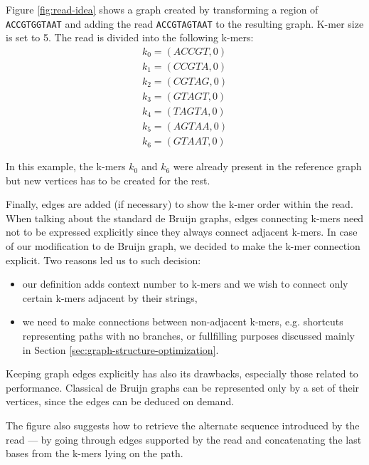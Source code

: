 Figure \ref{fig:read-idea} shows a graph created by transforming a region of \texttt{ACCGTGGTAAT} and adding the read \texttt{ACCGTAGTAAT} to the resulting graph. K-mer size is set to 5. The read is divided into the following k-mers:
\begin{align}
k_0 = (ACCGT, 0) \\
k_1 = (CCGTA, 0) \\
k_2 = (CGTAG, 0) \\
k_3 = (GTAGT, 0) \\
k_4 = (TAGTA, 0) \\
k_5 = (AGTAA, 0) \\
k_6 = (GTAAT, 0)
\end{align}

In this example, the k-mers $k_0$ and $k_6$ were already present in the reference graph but new vertices has to be created for the rest.

Finally, edges are added (if necessary) to show the k-mer order within the read. When talking about the standard de Bruijn graphs, edges connecting k-mers need not to be expressed explicitly since they always connect adjacent k-mers. In case of our modification to de Bruijn graph, we decided to make the k-mer connection explicit. Two reasons led us to such decision:
\begin{itemize}
\item our definition adds context number to k-mers and we wish to connect only certain k-mers adjacent by their strings,
\item we need to make connections between non-adjacent k-mers, e.g. shortcuts representing paths with no branches, or fullfilling purposes discussed mainly in Section \ref{sec:graph-structure-optimization}.
\end{itemize}

Keeping graph edges explicitly has also its drawbacks, especially those related to performance. Classical de Bruijn graphs can be represented only by a set of their vertices, since the edges can be deduced on demand.

The figure also suggests how to retrieve the alternate sequence introduced by the read --- by going through edges supported by the read and concatenating the last bases from the k-mers lying on the path. 

